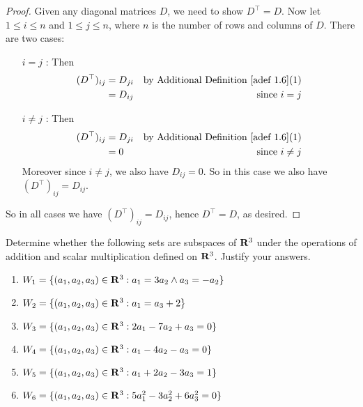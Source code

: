 \begin{proof}
Given any diagonal matrices \(D\), we need to show \(D^\top = D\).
Now let \(1 \le i \le n\) and \(1 \le j \le n\), where \(n\) is the number of rows and columns of \(D\).
There are two cases:
\begin{itemize}
    \item[\(i = j\)]: Then
        \begin{align*}
            (D^\top)_{ij} & = D_{ji} & \text{by \ADEF{1.6}(1)} \\
                       & = D_{ij} & \text{since \(i = j\)}
        \end{align*}
    \item[\(i \ne j\)]: Then
        \begin{align*}
            (D^\top)_{ij} & = D_{ji} & \text{by \ADEF{1.6}(1)} \\
                       & = 0 & \text{since \(i \ne j\)}
        \end{align*}
        Moreover since \(i \ne j\), we also have \(D_{ij} = 0\).
        So in this case we also have \((D^\top)_{ij} = D_{ij}\).
\end{itemize}
So in all cases we have \((D^\top)_{ij} = D_{ij}\), hence \(D^\top = D\), as desired.
\end{proof}

\begin{exercise} \label{exercise 1.3.8}
Determine whether the following sets are subspaces of \(\mathbf{R}^3\) under the operations of addition and scalar multiplication defined on \(\mathbf{R}^3\).
Justify your answers.
\begin{enumerate}
    \item \(W_1 = \{(a_1, a_2, a_3) \in \mathbf{R}^3 : a_1 = 3 a_2 \land a_3 = -a_2\}\)
    \item \(W_2 = \{(a_1, a_2, a_3) \in \mathbf{R}^3: a_1 = a_3 + 2\}\)
    \item \(W_3 = \{(a_1, a_2, a_3) \in \mathbf{R}^3 : 2a_1 - 7a_2 + a_3 = 0\}\)
    \item \(W_4 = \{(a_1, a_2, a_3) \in \mathbf{R}^3 : a_1 - 4a_2 - a_3 = 0\}\)
    \item \(W_5 = \{(a_1, a_2, a_3) \in \mathbf{R}^3 : a_1 + 2a_2 - 3a_3 = 1\}\)
    \item \(W_6 = \{(a_1, a_2, a_3) \in \mathbf{R}^3 : 5a_1^2 - 3a_2^2 + 6a_3^2 = 0\}\)
\end{enumerate}
\end{exercise}

